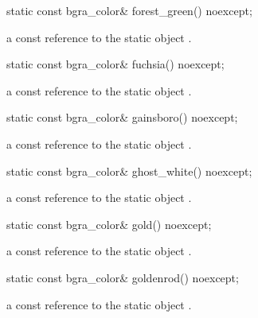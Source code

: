 \begin{itemdecl}
static const bgra_color& forest_green() noexcept;
\end{itemdecl}
\begin{itemdescr}
\pnum
\returns
a const reference to the static  object .
\end{itemdescr}

\begin{itemdecl}
static const bgra_color& fuchsia() noexcept;
\end{itemdecl}
\begin{itemdescr}
\pnum
\returns
a const reference to the static  object .
\end{itemdescr}

\begin{itemdecl}
static const bgra_color& gainsboro() noexcept;
\end{itemdecl}
\begin{itemdescr}
\pnum
\returns
a const reference to the static  object .
\end{itemdescr}

\begin{itemdecl}
static const bgra_color& ghost_white() noexcept;
\end{itemdecl}
\begin{itemdescr}
\pnum
\returns
a const reference to the static  object .
\end{itemdescr}

\begin{itemdecl}
static const bgra_color& gold() noexcept;
\end{itemdecl}
\begin{itemdescr}
\pnum
\returns
a const reference to the static  object .
\end{itemdescr}

\begin{itemdecl}
static const bgra_color& goldenrod() noexcept;
\end{itemdecl}
\begin{itemdescr}
\pnum
\returns
a const reference to the static  object .
\end{itemdescr}

